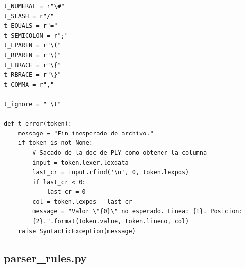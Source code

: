 \documentclass[a4paper, 10pt, twoside]{article}
\begin{document}
\begin{verbatim}
t_NUMERAL = r"\#"
t_SLASH = r"/"
t_EQUALS = r"="
t_SEMICOLON = r";"
t_LPAREN = r"\("
t_RPAREN = r"\)"
t_LBRACE = r"\{"
t_RBRACE = r"\}"
t_COMMA = r","

t_ignore = " \t"

def t_error(token):
    message = "Fin inesperado de archivo."
    if token is not None:
        # Sacado de la doc de PLY como obtener la columna
        input = token.lexer.lexdata
        last_cr = input.rfind('\n', 0, token.lexpos)
        if last_cr < 0:
            last_cr = 0    
        col = token.lexpos - last_cr
        message = "Valor \"{0}\" no esperado. Linea: {1}. Posicion:
        {2}.".format(token.value, token.lineno, col)
    raise SyntacticException(message)
\end{verbatim}
\subsection{parser\_rules.py}
\end{document}
